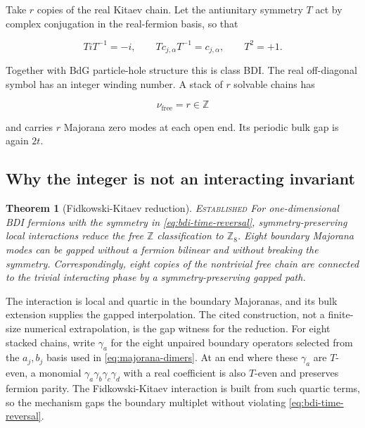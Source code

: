 \documentclass[12pt]{article}
\newtheorem{theorem}{Theorem}[section]
\theoremstyle{definition}
\theoremstyle{remark}
\newcommand{\EST}{\textnormal{\textsc{Established}}}
\begin{document}
Take $r$ copies of the real Kitaev chain.  Let the antiunitary symmetry $T$
act by complex conjugation in the real-fermion basis, so that

\begin{equation}
  T i T^{-1}=-i,
  \qquad
  T c_{j,\alpha}T^{-1}=c_{j,\alpha},
  \qquad
  T^2=+1.
  \label{eq:bdi-time-reversal}
\end{equation}

Together with BdG particle-hole structure this is class BDI.  The real
off-diagonal symbol has an integer winding number.  A stack of $r$ solvable
chains has

\begin{equation}
  \nu_{\mathrm{free}}=r\in\mathbb Z
\end{equation}

and carries $r$ Majorana zero modes at each open end.  Its periodic bulk gap
is again $2t$.

\subsection{Why the integer is not an interacting invariant}

\begin{theorem}[Fidkowski-Kitaev reduction]
\label{thm:fk}
\EST{}  For one-dimensional BDI fermions with the symmetry in
\cref{eq:bdi-time-reversal}, symmetry-preserving local interactions reduce
the free $\mathbb Z$ classification to $\mathbb Z_8$.  Eight boundary
Majorana modes can be gapped without a fermion bilinear and without breaking
the symmetry.  Correspondingly, eight copies of the nontrivial free chain
are connected to the trivial interacting phase by a symmetry-preserving
gapped path.
\end{theorem}

The interaction is local and quartic in the boundary Majoranas, and its bulk
extension supplies the gapped interpolation.  The cited construction, not a
finite-size numerical extrapolation, is the gap witness for the reduction.
For eight stacked chains, write $\gamma_a$ for the eight unpaired boundary
operators selected from the $a_j,b_j$ basis used in
\cref{eq:majorana-dimers}.  At an end where these $\gamma_a$ are $T$-even, a monomial
$\gamma_a\gamma_b\gamma_c\gamma_d$ with a real coefficient is also
$T$-even and preserves fermion parity.  The Fidkowski-Kitaev interaction is
built from such quartic terms, so the mechanism gaps the boundary multiplet
without violating \cref{eq:bdi-time-reversal}.
\end{document}
